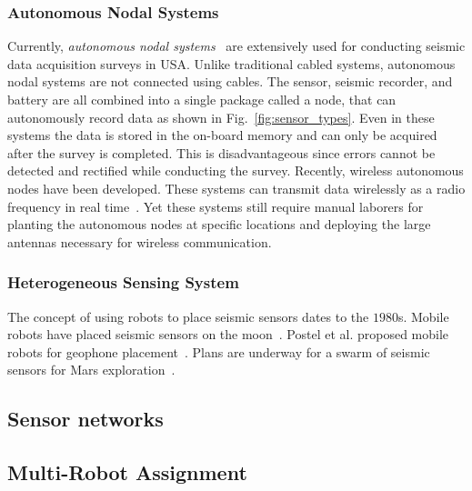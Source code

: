  \subsubsection{Autonomous Nodal Systems}
 Currently, \emph{autonomous nodal systems}~\cite{wood1998distributed} are extensively used for conducting seismic data acquisition surveys in USA. Unlike traditional cabled systems, autonomous nodal systems are not connected using cables. The sensor, seismic recorder, and battery are all combined into a single package called a node, that can autonomously record data as shown in Fig.~\ref{fig:sensor_types}. Even in these systems the data is stored in the on-board memory and can only be acquired after the survey is completed. This is disadvantageous since errors cannot be detected and rectified while conducting the survey. Recently, wireless autonomous nodes have been developed. These systems can transmit data wirelessly as a radio frequency in real time~\cite{jiang2015geophysical}. Yet these systems still require manual laborers for planting the autonomous nodes at specific locations and deploying the large antennas necessary for wireless communication.
\subsubsection{Heterogeneous Sensing System}
The concept of using robots to place seismic sensors dates to the $1980$s. Mobile robots have placed seismic sensors on the moon~\cite{LSisMSE81}. Postel et al. proposed mobile robots for geophone placement~\cite{DSSMaA14}. Plans are underway for a swarm of seismic sensors for Mars exploration~\cite{MAPL2006}.


\subsection{Sensor networks}
\subsection{Multi-Robot Assignment}